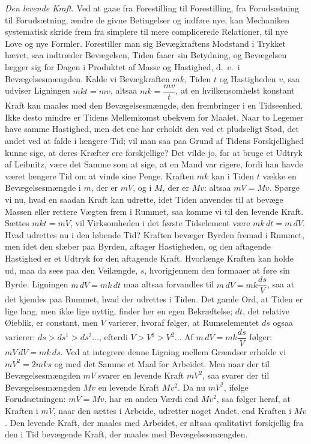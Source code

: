 \documentclass[12pt]{book}
\newcommand{\apage}[1]{\marginnote{\footnotesize\textit{[#1]}}}
\begin{document}
\emph{Den levende Kraft.} Ved at gaae fra Forestilling til Forestilling,
fra Forudsætning til Forudsætning, ændre de givne Betingelser og indføre
nye, kan Mechaniken systematisk skride frem fra simplere til mere
complicerede Relationer, til nye Love og nye Formler. Forestiller man sig
Bevægkraftens Modstand i Trykket hævet, saa indtræder Bevægelsen, Tiden
faaer sin Betydning, og Bevægelsen lægger sig for Dagen i Produktet af
Masse og Hastighed, d.\ e.\ i Bevægelsesmængden. Kalde vi Bevægkraften $mk$,
Tiden $t$ og Hastigheden $v$, saa udviser Ligningen $mkt = mv$, altsaa $mk
= \dfrac{mv}{t}$, at en hvilkensomhelst konstant Kraft kan maales med den
Bevægelsesmængde, den frembringer i en Tidseenhed. Ikke desto mindre er
Tidens Mellemkomst ubekvem for Maalet. Naar to Legemer have samme
Hastighed, men det ene har erholdt den ved et pludseligt Stød, det andet
ved at falde i længere Tid; vil man saa paa Grund af Tidens Forskjellighed
kunne sige, at deres Kræfter ere forskjellige? Det vilde \apage{131} jo, for at bruge
et Udtryk af Leibnitz, være det Samme som at sige, at en Mand var rigere,
fordi han havde været længere Tid om at vinde sine Penge. Kraften $mk$ kan
i Tiden $t$ vække en Bevægelsesmængde i $m$, der er $mV$, og i $M$, der er
$Mv$: altsaa $mV = Mv$. Spørge vi nu, hvad en saadan Kraft kan udrette,
idet Tiden anvendes til at bevæge Massen eller rettere Vægten frem i
Rummet, saa komme vi til den levende Kraft. Sættes $mkt = mV$, vil
Virksomheden i det første Tidselement være $mk\,dt = m\,dV$. Hvad udrettes
nu i den løbende Tid? Kraften bevæger Byrden fremad i Rummet, men idet den
slæber paa Byrden, aftager Hastigheden, og den aftagende Hastighed er et
Udtryk for den aftagende Kraft. Hvorlænge Kraften kan holde ud, maa da sees
paa den Veilængde, $s$, hvorigjennem den formaaer at føre sin Byrde.
Ligningen $m\,dV = mk\,dt$ maa altsaa forvandles til $m\,dV =
mk\dfrac{ds}{V}$, saa at det kjendes paa Rummet, hvad der udrettes i Tiden.
Det gamle Ord, at Tiden er lige lang, men ikke lige nyttig, finder her en
egen Bekræftelse; $dt$, det relative Øieblik, er constant, men $V$ varierer,
hvoraf følger, at Rumselementet $ds$ ogsaa varierer: $ds > ds^1 > ds^2
\ldots$, efterdi $V > V^1 > V^2 \ldots$ Af $m\,dV = mk\dfrac{ds}{V}$ følger:
$mV\,dV = mk\,ds$. Ved at integrere denne Ligning mellem Grændser erholde
vi $mV^2 = 2mks$ og med det Samme et Maal for Arbeidet. Men naar der til
Bevægelsesmængden $mV$ svarer en levende Kraft $mV^2$, saa svarer der til
Bevægelsesmængden $Mv$ en \apage{132} levende Kraft $Mv^2$. Da nu $mV^2$, ifølge
Forudsætningen: $mV = Mv$, har en anden Værdi end $Mv^2$, saa følger heraf,
at Kraften i $mV$, naar den sættes i Arbeide, udretter noget Andet, end
Kraften i $Mv$. Den levende Kraft, der maales med Arbeidet, er altsaa
qvalitativt forskjellig fra den i Tid bevægende Kraft, der maales med
Bevægelsesmængden.
\end{document}
